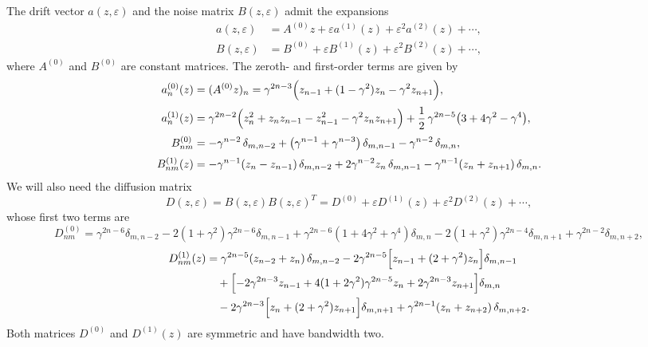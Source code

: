 \documentclass[aps,twocolumn,superscriptaddress]{revtex4-2}
\begin{document}
The drift vector \(a(z,\varepsilon)\) and the noise matrix \(B(z,\varepsilon)\) admit the expansions
\begin{align}
a(z,\varepsilon) &= A^{(0)} z+\varepsilon a^{(1)}(z)+\varepsilon^2 a^{(2)}(z)+\cdots,
\label{eq_a_exp} \\
B(z,\varepsilon) &= B^{(0)}+\varepsilon B^{(1)}(z)+\varepsilon^2 B^{(2)}(z)+\cdots,
\label{eq_B_exp}
\end{align}
where \(A^{(0)}\) and \(B^{(0)}\) are constant matrices. The zeroth- and first-order terms are given by
\begin{align}
a_n^{(0)}(z)
&= (A^{(0)} z)_n
= \gamma^{2n-3}\Bigl(
z_{n-1}+(1-\gamma^2)z_n-\gamma^2 z_{n+1}
\Bigr),
\label{eq_terms_a0}
\\[2pt]
a_n^{(1)}(z)
&=
\gamma^{2n-2}\Bigl(
z_n^2+z_n z_{n-1}-z_{n-1}^2-\gamma^2 z_n z_{n+1}
\Bigr)
+\frac12\,\gamma^{2n-5}\bigl(3+4\gamma^2-\gamma^4\bigr),
\label{eq_terms_a1}
\\[2pt]
B_{nm}^{(0)}
&=
-\gamma^{n-2}\,\delta_{m,n-2}
+\bigl(\gamma^{n-1}+\gamma^{n-3}\bigr)\,\delta_{m,n-1}
-\gamma^{n-2}\,\delta_{m,n},
\label{eq_terms_B0}
\\[2pt]
B_{nm}^{(1)}(z)
&=
-\gamma^{n-1}(z_n-z_{n-1})\,\delta_{m,n-2}
+2\gamma^{n-2}z_n\,\delta_{m,n-1}
-\gamma^{n-1}(z_n+z_{n+1})\,\delta_{m,n}.
\label{eq_terms_B1}
\end{align}
We will also need the diffusion matrix
\begin{equation}
D(z,\varepsilon)= B(z,\varepsilon) B(z,\varepsilon)^T = D^{(0)}+\varepsilon D^{(1)}(z)+\varepsilon^2 D^{(2)}(z)+\cdots,
\label{eq_D_exp}
\end{equation}
whose first two terms are
\begin{equation}
D^{(0)}_{nm}
=
\gamma^{2n-6}\delta_{m,n-2}
-2(1+\gamma^2)\gamma^{2n-6}\delta_{m,n-1}
+\gamma^{2n-6}(1+4\gamma^2+\gamma^4)\delta_{m,n}
-2(1+\gamma^2)\gamma^{2n-4}\delta_{m,n+1}
+\gamma^{2n-2}\delta_{m,n+2},
\label{eq_terms_D0}
\end{equation}
\begin{align}
D^{(1)}_{nm}(z)
&=
\gamma^{2n-5}(z_{n-2}+z_n)\,\delta_{m,n-2}
-2\gamma^{2n-5}\Bigl[z_{n-1}+(2+\gamma^2)z_n\Bigr]\delta_{m,n-1}
\nonumber\\
&\quad
+\Bigl[
-2\gamma^{2n-3}z_{n-1}
+4(1+2\gamma^2)\gamma^{2n-5}z_n
+2\gamma^{2n-3}z_{n+1}
\Bigr]\delta_{m,n}
\nonumber\\
&\quad
-2\gamma^{2n-3}\Bigl[z_n+(2+\gamma^2)z_{n+1}\Bigr]\delta_{m,n+1}
+\gamma^{2n-1}(z_n+z_{n+2})\,\delta_{m,n+2}.
\label{eq_terms_D1}
\end{align}
Both matrices \(D^{(0)}\) and \(D^{(1)}(z)\) are symmetric and have bandwidth two.
\end{document}
